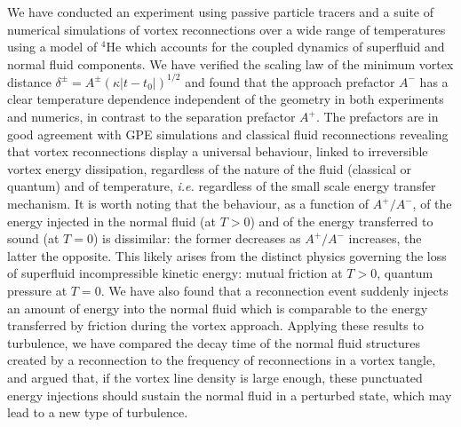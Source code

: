 \documentclass[9pt,twocolumn,twoside]{pnas-new}
\providecommand{\DIFdelbegin}{} %
\newcommand{\DIFscaledelfig}{0.5}
\newlength{\DIFdelgraphicswidth} %
\newlength{\DIFdelgraphicsheight} %
\newcommand{\DIFdelincludegraphics}[2][]{%
\sbox{\DIFdelgraphicsbox}{\DIFOincludegraphics[#1]{#2}}%
\settoboxwidth{\DIFdelgraphicswidth}{\DIFdelgraphicsbox} %
\settoboxtotalheight{\DIFdelgraphicsheight}{\DIFdelgraphicsbox} %
\scalebox{\DIFscaledelfig}{%
\parbox[b]{\DIFdelgraphicswidth}{\usebox{\DIFdelgraphicsbox}\\[-\baselineskip] \rule{\DIFdelgraphicswidth}{0em}}\llap{\resizebox{\DIFdelgraphicswidth}{\DIFdelgraphicsheight}{%
\setlength{\unitlength}{\DIFdelgraphicswidth}%
\begin{picture}(1,1)%
\thicklines\linethickness{2pt} %
{\color[rgb]{1,0,0}\put(0,0){\framebox(1,1){}}}%
{\color[rgb]{1,0,0}\put(0,0){\line( 1,1){1}}}%
{\color[rgb]{1,0,0}\put(0,1){\line(1,-1){1}}}%
\end{picture}%
}\hspace*{3pt}}} %
} %
\DeclareRobustCommand{\DIFdelbegin}{\DIFOdelbegin \let\includegraphics\DIFdelincludegraphics} %
\begin{document}
We have conducted an experiment using passive particle tracers and a suite of numerical simulations of vortex reconnections over a wide range of temperatures using a model of $^4$He which accounts for the coupled dynamics of superfluid and normal fluid components.
We have verified the scaling law of the minimum vortex distance 
$\delta^{\pm}=A^{\pm} (\kappa |t-t_0|)^{1/2}$ and found that the approach prefactor $A^-$ has a clear temperature dependence independent of the geometry in both experiments and numerics, in contrast to the
separation prefactor $A^+$. The prefactors are in good agreement
with GPE simulations \cite{villoisIrreversibleDynamicsVortex2020,allen2014} 
and classical fluid reconnections \cite{yaoSeparationScalingViscous2020}
revealing that vortex reconnections display a universal behaviour, linked to irreversible vortex energy dissipation, regardless of the nature
of the fluid (classical or quantum) and of temperature, \textit{i.e.} regardless of the small scale energy transfer mechanism. 
It is worth noting that the behaviour, as a function of $A^+/A^-$, of 
the energy injected in the normal fluid (at $T>0$) and of the energy transferred to sound (at $T=0$)
\cite{villoisIrreversibleDynamicsVortex2020,leadbeaterSoundEmissionDue2001b} is dissimilar: the former decreases as $A^+/A^-$
increases, the latter the opposite. This likely arises from the distinct physics governing the loss of superfluid 
incompressible kinetic energy: mutual friction at $T>0$, quantum pressure at $T=0$.
We have also found that a reconnection event suddenly injects an amount of energy 
into the normal fluid which is comparable to the energy transferred by friction
during the vortex approach. Applying these results to turbulence, we have
compared the decay time of the normal fluid structures created by a
reconnection to the frequency of reconnections in a vortex tangle, and argued
that, if the vortex line density is large enough, these punctuated
energy injections should sustain the normal fluid in a perturbed state, which may lead to a new type of turbulence.

\DIFdelbegin %
\end{document}

